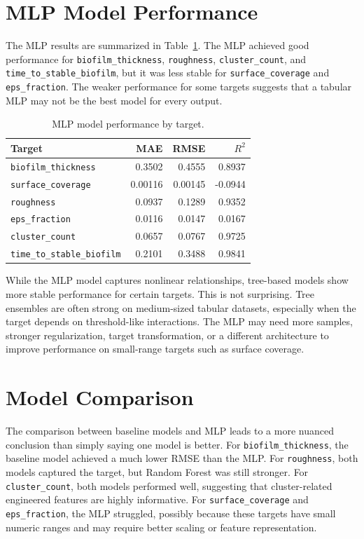 \documentclass[12pt,a4paper,oneside]{report}
\begin{document}
\section{MLP Model Performance}
The MLP results are summarized in Table~\ref{tab:mlp-results}. The MLP achieved good performance for \texttt{biofilm\_thickness}, \texttt{roughness}, \texttt{cluster\_count}, and \texttt{time\_to\_stable\_biofilm}, but it was less stable for \texttt{surface\_coverage} and \texttt{eps\_fraction}. The weaker performance for some targets suggests that a tabular MLP may not be the best model for every output.

\begin{table}[H]
\centering
\caption{MLP model performance by target.}
\label{tab:mlp-results}
\begin{tabular}{lrrr}
\toprule
Target & MAE & RMSE & $R^2$\\
\midrule
\texttt{biofilm\_thickness} & 0.3502 & 0.4555 & 0.8937\\
\texttt{surface\_coverage} & 0.00116 & 0.00145 & -0.0944\\
\texttt{roughness} & 0.0937 & 0.1289 & 0.9352\\
\texttt{eps\_fraction} & 0.0116 & 0.0147 & 0.0167\\
\texttt{cluster\_count} & 0.0657 & 0.0767 & 0.9725\\
\texttt{time\_to\_stable\_biofilm} & 0.2101 & 0.3488 & 0.9841\\
\bottomrule
\end{tabular}
\end{table}

While the MLP model captures nonlinear relationships, tree-based models show more stable performance for certain targets. This is not surprising. Tree ensembles are often strong on medium-sized tabular datasets, especially when the target depends on threshold-like interactions. The MLP may need more samples, stronger regularization, target transformation, or a different architecture to improve performance on small-range targets such as surface coverage.

\section{Model Comparison}
The comparison between baseline models and MLP leads to a more nuanced conclusion than simply saying one model is better. For \texttt{biofilm\_thickness}, the baseline model achieved a much lower RMSE than the MLP. For \texttt{roughness}, both models captured the target, but Random Forest was still stronger. For \texttt{cluster\_count}, both models performed well, suggesting that cluster-related engineered features are highly informative. For \texttt{surface\_coverage} and \texttt{eps\_fraction}, the MLP struggled, possibly because these targets have small numeric ranges and may require better scaling or feature representation.
\end{document}
